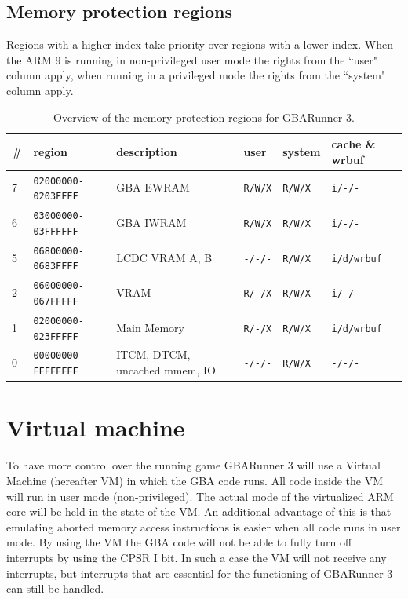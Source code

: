 \documentclass[a4paper,10pt]{report}
\begin{document}
	\section{Memory protection regions}
		Regions with a higher index take priority over regions with a lower index. When the ARM 9 is running in non-privileged user mode the rights from the ``user" column apply, when running in a privileged mode the rights from the ``system" column apply.
		\begin{table}[htb]
			\centering
			\begin{tabular}{l|l|l|l|l|l}
				\# & region & description & user & system & cache \& wrbuf \\ \hline
				7 & \texttt{02000000-0203FFFF} & GBA EWRAM & \texttt{R/W/X} & \texttt{R/W/X} & \texttt{i/-/-} \\
				6 & \texttt{03000000-03FFFFFF} & GBA IWRAM & \texttt{R/W/X} & \texttt{R/W/X} & \texttt{i/-/-} \\
				5 & \texttt{06800000-0683FFFF} & LCDC VRAM A, B & \texttt{-/-/-} & \texttt{R/W/X} & \texttt{i/d/wrbuf} \\
				2 & \texttt{06000000-067FFFFF} & VRAM & \texttt{R/-/X} & \texttt{R/W/X} & \texttt{i/-/-} \\
				1 & \texttt{02000000-023FFFFF} & Main Memory & \texttt{R/-/X} & \texttt{R/W/X} & \texttt{i/d/wrbuf} \\
				0 & \texttt{00000000-FFFFFFFF} & ITCM, DTCM, uncached mmem, IO & \texttt{-/-/-} & \texttt{R/W/X} & \texttt{-/-/-}
			\end{tabular}
			\caption{Overview of the memory protection regions for GBARunner 3.}			
		\end{table}
	
\chapter{Virtual machine}\label{chap_vm}
	To have more control over the running game GBARunner 3 will use a Virtual Machine (hereafter VM) in which the GBA code runs. All code inside the VM will run in user mode (non-privileged). The actual mode of the virtualized ARM core will be held in the state of the VM. An additional advantage of this is that emulating aborted memory access instructions is easier when all code runs in user mode. By using the VM the GBA code will not be able to fully turn off interrupts by using the CPSR I bit. In such a case the VM will not receive any interrupts, but interrupts that are essential for the functioning of GBARunner 3 can still be handled.
	
\end{document}
